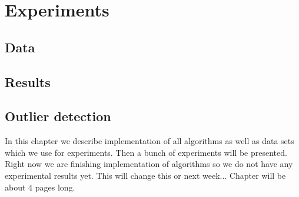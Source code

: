 \chapter{Experiments}
\section{Data}
\section{Results}
\section{Outlier detection}













In this chapter we describe implementation of all algorithms as well as data sets which we use for experiments. Then a bunch of experiments will be presented.
Right now we are finishing implementation of algorithms so we do not have any experimental results yet.
This will change this or next week...
Chapter will be about 4 pages long.